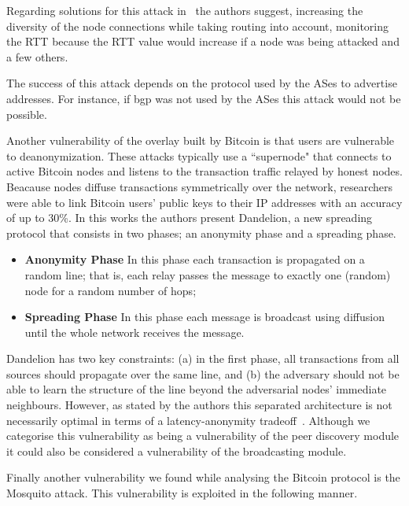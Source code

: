 Regarding solutions for this attack in~\cite{apostolaki2016hijacking} the authors suggest, increasing the diversity of the node connections while taking routing into account, monitoring the RTT because the RTT value would increase if a node was being attacked and a few others.

The success of this attack depends on the protocol used by the ASes to advertise addresses. For instance, if \acrshort{bgp} was not used by the ASes this attack would not be possible.


Another vulnerability of the overlay built by Bitcoin is that users are vulnerable to deanonymization. These attacks typically use a ``supernode" that connects to active Bitcoin nodes and listens to the transaction traffic relayed by honest nodes. Beacause nodes diffuse transactions symmetrically over the network, researchers were able to link Bitcoin users’ public keys to their IP addresses with an accuracy of up to 30\%. In this works the authors present Dandelion, a new spreading protocol that consists in two phases; an anonymity phase and a spreading phase.
\begin{itemize}
    \item \textbf{Anonymity Phase} In this phase each transaction is propagated on a random line; that is, each relay passes the message to exactly one (random) node for a random number of hops;
    \item \textbf{Spreading Phase} In this phase each message is broadcast using diffusion until the whole network receives the message.
\end{itemize}
Dandelion has two key constraints: (a) in the first phase, all transactions from all sources should propagate over the same line, and (b) the adversary should not be able to learn the structure of the line beyond the adversarial nodes’ immediate neighbours.
However, as stated by the authors this separated architecture is not necessarily optimal in terms of a latency-anonymity tradeoff~\cite{bojja2017dandelion}. Although we categorise this vulnerability as being a vulnerability of the peer discovery module it could also be considered a vulnerability of the broadcasting module.

Finally another vulnerability we found while analysing the Bitcoin protocol is the Mosquito attack. This vulnerability is exploited in the following manner.

